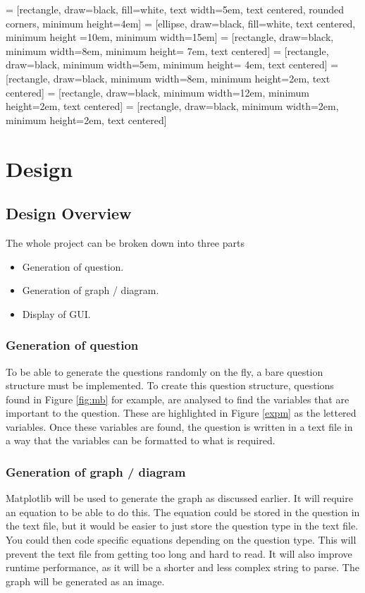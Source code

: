  = [rectangle, draw=black, fill=white, text width=5em, text centered, rounded corners, minimum height=4em]
 = [ellipse, draw=black, fill=white, text centered, minimum height =10em, minimum width=15em]
 = [rectangle, draw=black, minimum width=8em, minimum height= 7em, text centered]
 = [rectangle, draw=black, minimum width=5em, minimum height= 4em, text centered]
 = [rectangle, draw=black, minimum width=8em, minimum height=2em, text centered]
 = [rectangle, draw=black, minimum width=12em, minimum height=2em, text centered]
 = [rectangle, draw=black, minimum width=2em, minimum height=2em, text centered]
\chapter{Design}
\section{Design Overview}
The whole project can be broken down into three parts
\begin{itemize}
	\item Generation of question.
	\item Generation of graph / diagram.
	\item Display of GUI.
\end{itemize}
\subsection{Generation of question}
To be able to generate the questions randomly on the fly, a bare question structure must be implemented. To create this question structure, questions found in Figure \ref{fig:mb} for example, are analysed to find the variables that are important to the question. These are highlighted in Figure \ref{expm} as the lettered variables. Once these variables are found, the question is written in a text file in a way that the variables can be formatted to what is required.
\subsection{Generation of graph / diagram} 
Matplotlib will be used to generate the graph as discussed earlier. It will require an equation to be able to do this. The equation could be stored in the question in the text file, but it would be easier to just store the question type in the text file. You could then code specific equations depending on the question type. This will prevent the text file from getting too long and hard to read. It will also improve runtime performance, as it will be a shorter and less complex string to parse. The graph will be generated as an image.

